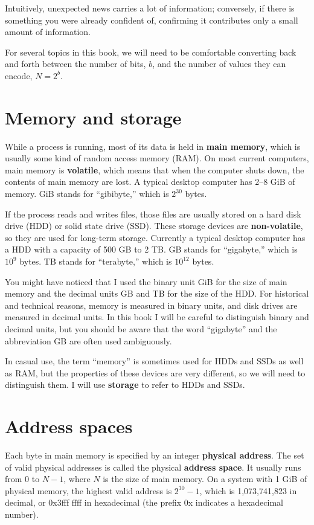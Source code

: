 \documentclass[12pt]{book}
\begin{document}
{Intuitively, unexpected news carries a lot of
information; conversely, if there is something you were already confident
of, confirming it contributes only a small amount of information.

For several topics in this book, we will need to be comfortable
converting back and forth between the number of bits, $b$, and the
number of values they can encode, $N = 2^b$.


\section{Memory and storage}

While a process is running, most of its data is held in {\bf main
memory}, which is usually some kind of random access memory (RAM).
On most current computers, main memory is {\bf volatile}, which means that
when the computer shuts down, the contents of main memory are lost.
A typical desktop computer has 2--8 GiB of
memory.  GiB stands for ``gibibyte,'' which is $2^{30}$ bytes.  

If the process reads and writes files, those files are usually stored
on a hard disk drive (HDD) or solid state drive (SSD).  These storage
devices are {\bf non-volatile}, so they are used for long-term storage.
Currently a typical desktop computer has a HDD with a capacity of 500
GB to 2 TB.  GB stands for ``gigabyte,'' which is $10^9$ bytes.  TB
stands for ``terabyte,'' which is $10^{12}$ bytes.

You might have noticed that I used the binary unit
GiB for the size of main memory and the decimal units GB and TB for
the size of the HDD.  For historical and technical reasons, memory is
measured in binary units, and disk drives are measured in decimal
units.  In this book I will be careful to distinguish binary and
decimal units, but you should be aware that the word ``gigabyte'' and the
abbreviation GB are often used ambiguously.

In casual use, the term ``memory'' is sometimes used for HDDs and SSDs
as well as RAM, but the properties of these devices are very
different, so we will need to distinguish them.  I will use
{\bf storage} to refer to HDDs and SSDs.


\section{Address spaces}

Each byte in main memory is specified by an integer {\bf physical
address}.  The set of valid physical addresses is called the
physical {\bf address space}.  It
usually runs from 0 to $N-1$, where $N$ is
the size of main memory.  On a system with 1 GiB of physical memory,
the highest valid address is $2^{30}-1$, which is 1,073,741,823 in
decimal, or 0x3fff ffff in hexadecimal (the prefix 0x indicates a
hexadecimal number).

}
\end{document}
